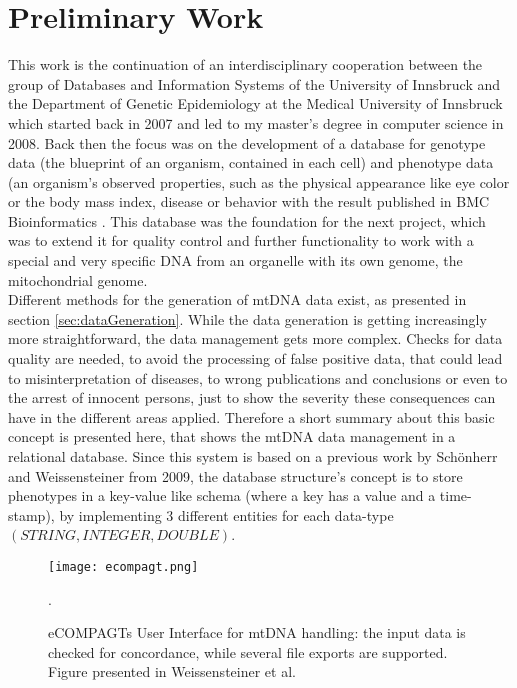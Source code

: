 \section{Preliminary Work}
\label{prelimWork}
This work is the continuation of an interdisciplinary cooperation between the group of Databases and Information Systems of the University of Innsbruck and the Department of Genetic Epidemiology at the Medical University of Innsbruck which started back in 2007 and led to my master's degree in computer science in 2008. Back then the focus was on the development of a database for genotype data (the blueprint of an organism, contained in each cell) and phenotype data (an organism's observed properties, such as the physical appearance like eye color or the body mass index, disease or behavior with the result published in BMC Bioinformatics \cite{Schoenherr2009}. This database was the foundation for the next project, which was to extend it for quality control and further functionality to work with a special and very specific DNA from an organelle with its own genome, the mitochondrial genome. 
\\
Different methods for the generation of mtDNA data exist, as presented in section \ref{sec:dataGeneration}. While the data generation is getting increasingly more straightforward, the data management gets more complex. Checks for data quality are needed, to avoid the processing of false positive data, that could lead to misinterpretation of diseases, to wrong publications and conclusions or even to the arrest of innocent persons, just to show the severity these consequences can have in the different areas applied.
Therefore a short summary about this basic concept is presented here, that shows the mtDNA data management in a relational database. Since this system is based on a previous work by Sch\"onherr and Weissensteiner \cite{Schoenherr2009} from 2009, the database structure's concept is to store phenotypes in a key-value like schema (where a key has a value and a time-stamp), by implementing 3 different entities for each data-type $(STRING, INTEGER, DOUBLE)$.
\begin{figure}[ht]
\begin{center}
\texttt{[image: ecompagt.png]}
\caption[eCOMPAGTs User Interface]{eCOMPAGTs User Interface for mtDNA handling: the input data is checked for concordance, while several file exports are supported. Figure presented in Weissensteiner et al. \cite{Weissensteiner2010}}.
\label{fig:ecompagt}
\end{center}
\end{figure}
